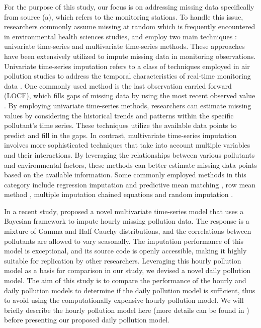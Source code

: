 \documentclass[
  12,
]{article}
\begin{document}
For the purpose of this study, our focus is on addressing missing data
specifically from source (a), which refers to the monitoring stations.
To handle this issue, researchers commonly assume missing at random
\autocite[MAR, see e.g.,][]{Little2019} which is frequently encountered
in environmental health sciences studies, and employ two main techniques
\autocite{Hadeed2020}: univariate time-series and multivariate
time-series methods. These approaches have been extensively utilized to
impute missing data in monitoring observations. Univariate time-series
imputation refers to a class of techniques employed in air pollution
studies to address the temporal characteristics of real-time monitoring
data \autocite{Moritz2015}. One commonly used method is the last
observation carried forward (LOCF), which fills gaps of missing data by
using the most recent observed value \autocite{Engels2003,Plaia2006}. By
employing univariate time-series methods, researchers can estimate
missing values by considering the historical trends and patterns within
the specific pollutant's time series. These techniques utilize the
available data points to predict and fill in the gaps. In contrast,
multivariate time-series imputation involves more sophisticated
techniques that take into account multiple variables and their
interactions. By leveraging the relationships between various pollutants
and environmental factors, these methods can better estimate missing
data points based on the available information. Some commonly employed
methods in this category include regression imputation and predictive
mean matching \autocites[PMM, see e.g.,][]{Rubin1986,Little1988}, row
mean method \autocite[RMM, see e.g.,][]{Engels2003} , multiple
imputation chained equations \autocite[MICE, see e.g.,][]{Rubin1988} and
random imputation \autocite{Moritz2015}.

In a recent study, \textcite{Huang2022} proposed a novel multivariate
time-series model that uses a Bayesian framework to impute hourly
missing pollution data. The response is a mixture of Gamma and
Half-Cauchy distributions, and the correlations between pollutants are
allowed to vary seasonally. The imputation performance of this model is
exceptional, and its source code is openly accessible, making it highly
suitable for replication by other researchers. Leveraging this hourly
pollution model as a basis for comparison in our study, we devised a
novel daily pollution model. The aim of this study is to compare the
performance of the hourly and daily pollution models to determine if the
daily pollution model is sufficient, thus to avoid using the
computationally expensive hourly pollution model. We will briefly
describe the hourly pollution model here (more details can be found in
\textcite{Huang2022}) before presenting our proposed daily pollution
model.
\end{document}
